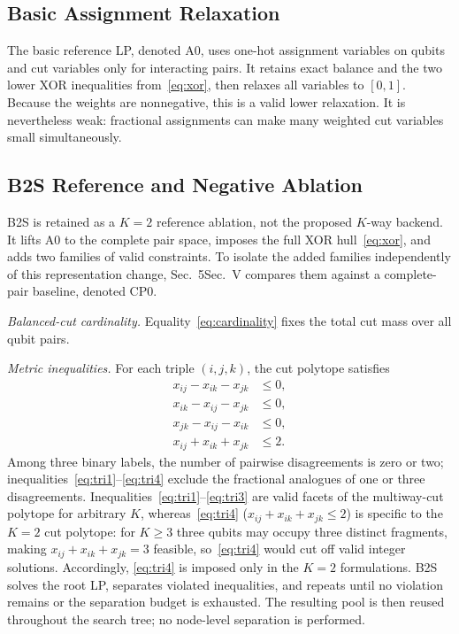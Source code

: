 \documentclass[11pt]{article}
\begin{document}
\subsection{Basic Assignment Relaxation}

The basic reference LP, denoted A0, uses one-hot assignment variables on qubits and cut variables only for interacting pairs. It retains exact balance and the two lower XOR inequalities from~\eqref{eq:xor}, then relaxes all variables to $[0,1]$. Because the weights are nonnegative, this is a valid lower relaxation. It is nevertheless weak: fractional assignments can make many weighted cut variables small simultaneously.

\subsection{B2S Reference and Negative Ablation}

B2S is retained as a $K=2$ reference ablation, not the proposed $K$-way backend. It lifts A0 to the complete pair space, imposes the full XOR hull~\eqref{eq:xor}, and adds two families of valid constraints. To isolate the added families independently of this representation change, \ifdefined\quantumversion Sec.~5\else Sec.~V\fi{} compares them against a complete-pair baseline, denoted CP0.

\textit{Balanced-cut cardinality.} Equality~\eqref{eq:cardinality} fixes the total cut mass over all qubit pairs.

\textit{Metric inequalities.} For each triple $(i,j,k)$, the cut polytope satisfies~\cite{deza1997}
\begin{align}
  x_{ij} - x_{ik} - x_{jk} &\leq 0, \label{eq:tri1}\\
  x_{ik} - x_{ij} - x_{jk} &\leq 0, \label{eq:tri2}\\
  x_{jk} - x_{ij} - x_{ik} &\leq 0, \label{eq:tri3}\\
  x_{ij} + x_{ik} + x_{jk} &\leq 2. \label{eq:tri4}
\end{align}
Among three binary labels, the number of pairwise disagreements is zero or two; inequalities~\eqref{eq:tri1}--\eqref{eq:tri4} exclude the fractional analogues of one or three disagreements. Inequalities~\eqref{eq:tri1}--\eqref{eq:tri3} are valid facets of the multiway-cut polytope for arbitrary $K$, whereas~\eqref{eq:tri4} ($x_{ij}+x_{ik}+x_{jk}\le2$) is specific to the $K=2$ cut polytope: for $K\ge3$ three qubits may occupy three distinct fragments, making $x_{ij}+x_{ik}+x_{jk}=3$ feasible, so~\eqref{eq:tri4} would cut off valid integer solutions. Accordingly, \eqref{eq:tri4} is imposed only in the $K=2$ formulations. B2S solves the root LP, separates violated inequalities, and repeats until no violation remains or the separation budget is exhausted. The resulting pool is then reused throughout the search tree; no node-level separation is performed.
\end{document}
